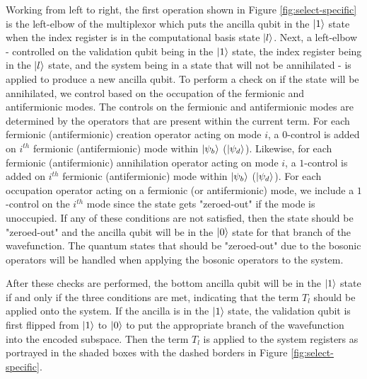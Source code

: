 Working from left to right, the first operation shown in Figure \ref{fig:select-specific} is the left-elbow of the multiplexor which puts the ancilla qubit in the $\ket{1}$ state when the index register is in the computational basis state $\ket{l}$.
Next, a left-elbow - controlled on the validation qubit being in the $\ket{1}$ state, the index register being in the $\ket{l}$ state, and the system being in a state that will not be annihilated - is applied to produce a new ancilla qubit.
To perform a check on if the state will be annihilated, we control based on the occupation of the fermionic and antifermionic modes.
The controls on the fermionic and antifermionic modes are determined by the operators that are present within the current term.
For each fermionic (antifermionic) creation operator acting on mode $i$, a $0$-control is added on $i^{th}$ fermionic (antifermionic) mode within $\ket{\psi_b}$ ($\ket{\psi_d}$).
Likewise, for each fermionic (antifermionic) annihilation operator acting on mode $i$, a $1$-control is added on $i^{th}$ fermionic (antifermionic) mode within $\ket{\psi_b}$ ($\ket{\psi_d}$).
For each occupation operator acting on a fermionic (or antifermionic) mode, we include a $1$-control on the $i^{th}$ mode since the state gets "zeroed-out" if the mode is unoccupied.
If any of these conditions are not satisfied, then the state should be "zeroed-out" and the ancilla qubit will be in the $\ket{0}$ state for that branch of the wavefunction.
The quantum states that should be "zeroed-out" due to the bosonic operators will be handled when applying the bosonic operators to the system.

After these checks are performed, the bottom ancilla qubit will be in the $\ket{1}$ state if and only if the three conditions are met, indicating that the term $T_l$ should be applied onto the system.
If the ancilla is in the $\ket{1}$ state, the validation qubit is first flipped from $\ket{1}$ to $\ket{0}$ to put the appropriate branch of the wavefunction into the encoded subspace.
Then the term $T_l$ is applied to the system registers as portrayed in the shaded boxes with the dashed borders in Figure \ref{fig:select-specific}.

